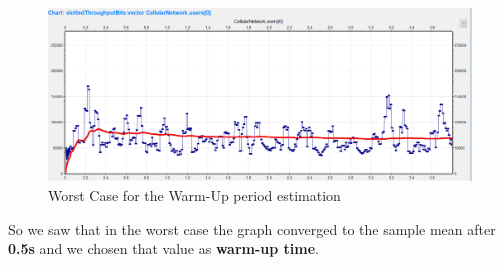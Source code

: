 \begin{figure}[H]
  \includegraphics[width=1\textwidth]{images/binomial_user0_rate9_6_rep9}
  \caption{Worst Case for the Warm-Up period estimation}
  \label{fig:warm_up time}
\end{figure}

So we saw that in the worst case the graph converged to the sample mean after \textbf{0.5s} and we chosen that value as \textbf{warm-up time}. 